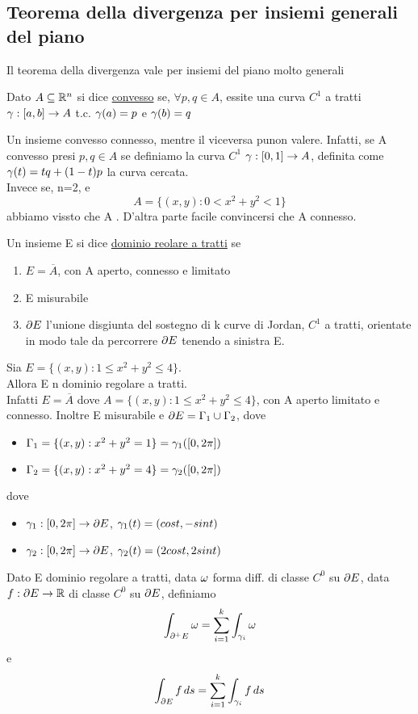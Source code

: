 \subsection{Teorema della divergenza per insiemi generali del piano}
Il teorema della divergenza vale per insiemi del piano molto generali
\begin{definition}
  Dato $A\subseteq\mathbb{R}^n$ si dice \underline{convesso} se, $\forall p,q \in A$, essite una curva 
  $C^1$ a tratti $\gamma:[a,b]\to A$ t.c. $\gamma(a)=p$ e $\gamma(b) = q$
\end{definition}
\begin{osservazione}
  Un insieme convesso \ace connesso, mentre il viceversa pu\aco non valere. Infatti, se A \ace convesso
  presi $p,q\in A$ se definiamo la curva $C^1$ $\gamma:[0,1]\to A$, definita come 
  $\gamma(t) = tq+(1-t)p$ \ace la curva cercata.\\
  Invece se, n=2, e 
  $$A=\{(x,y):0<x^2+y^2<1\}$$
  abbiamo vissto che A . D'altra parte \ace facile convincersi che A \ace connesso.
\end{osservazione}
\begin{definition}
  Un insieme E si dice \underline{dominio reolare a tratti} se 
  \begin{enumerate}
    \item $E=\overline{A}$, con A aperto, connesso e limitato
    \item E \ace misurabile
    \item $\partial E$ \ace l'unione disgiunta del sostegno di k curve di Jordan, $C^1$ a tratti, orientate in 
          modo tale da percorrere $\partial E$ tenendo a sinistra E.
  \end{enumerate}
\end{definition}
\begin{example}
  Sia $E=\{(x,y): 1\leq x^2+y^2\leq 4\}$. \\
  Allora E \ace n dominio regolare a tratti. \\ 
  Infatti $E=\overline{A}$ dove $A = \{(x,y): 1 \leq x^2+y^2 \leq 4\}$, con A aperto limitato e connesso. 
  Inoltre E \ace misurabile e $\partial E = \Gamma_1 \cup \Gamma_2$, dove 
  \begin{itemize}
    \item $\Gamma_1 = \{(x,y):x^2+y^2=1\} = \gamma_1([0,2\pi])$
    \item $\Gamma_2 = \{(x,y):x^2+y^2=4\} = \gamma_2([0,2\pi])$
  \end{itemize}
  dove 
  \begin{itemize}
    \item $\gamma_1 : [0,2\pi]\to \partial E$, $\gamma_1(t) = (cost, -sint)$
    \item $\gamma_2 : [0,2\pi]\to \partial E$, $\gamma_2(t) = (2cost, 2sint)$
  \end{itemize}
  Dato E dominio regolare a tratti, data $\omega$ forma diff. di classe $C^0$ su $\partial E$, 
  data $f:\partial E \to \mathbb{R}$ di classe $C^0$ su $\partial E$, definiamo 
  $$\int_{\partial^+ E} \omega = \sum_{i=1}^k \int_{\gamma_i}\omega$$
  e 
  $$\int_{\partial E} f\,ds = \sum_{i=1}^k \int_{\gamma_i}f \,ds $$
\end{example}
